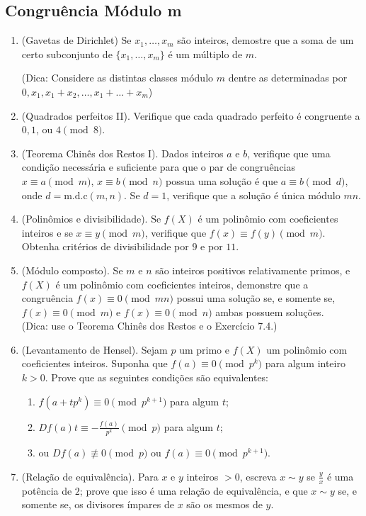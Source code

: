 \subsection{Congruência Módulo m}

\begin{enumerate}[label=7.\arabic*.]
    \item (Gavetas de Dirichlet) Se $x_1,\ldots,x_m$ são inteiros, demostre que a soma de um certo subconjunto
    de $\{x_1,\ldots,x_m\}$ é um múltiplo de $m$.

    (Dica: Considere as distintas classes módulo $m$ dentre as determinadas por $0, x_1, x_1 + x_2, \ldots , x_1 + \ldots + x_m$)

    \item (Quadrados perfeitos II). Verifique que cada quadrado perfeito é congruente a 
    $0, 1$, ou $4 \pmod{8}$.

    \item (Teorema Chinês dos Restos I). Dados inteiros $a$ e $b$, verifique que uma condição 
    necessária e suficiente para que o par de congruências $x \equiv a \pmod{m}$, 
    $x \equiv b \pmod{n}$ possua uma solução é que $a \equiv b \pmod{d}$, onde $d = \text{m.d.c}(m,n)$. Se $d = 1$, 
    verifique que a solução é única módulo $mn$.

    \item (Polinômios e divisibilidade). Se $f(X)$ é um polinômio com coeficientes inteiros 
    e se $x \equiv y \pmod{m}$, verifique que $f(x) \equiv f(y) \pmod{m}$. Obtenha critérios de 
    divisibilidade por $9$ e por $11$.

    \item (Módulo composto). Se $m$ e $n$ são inteiros positivos relativamente primos, e $f(X)$ 
    é um polinômio com coeficientes inteiros, demonstre que a congruência 
    $f(x) \equiv 0 \pmod{mn}$ possui uma solução se, e somente se, $f(x) \equiv 0 \pmod{m}$ e 
    $f(x) \equiv 0 \pmod{n}$ ambas possuem soluções. \\
    (Dica: use o Teorema Chinês dos Restos e o Exercício 7.4.)

    \item (Levantamento de Hensel). Sejam $p$ um primo e $f(X)$ um polinômio com coeficientes 
    inteiros. Suponha que $f(a) \equiv 0 \pmod{p^k}$ para algum inteiro $k>0$. Prove que as 
    seguintes condições são equivalentes:
    \begin{enumerate}
        \item[(i)] $f(a + tp^k) \equiv 0 \pmod{p^{k+1}}$ para algum $t$;
        \item[(ii)] $Df(a)t \equiv -\frac{f(a)}{p^k} \pmod{p}$ para algum $t$;
        \item[(iii)] ou $Df(a) \not\equiv 0 \pmod{p}$ ou $f(a) \equiv 0 \pmod{p^{k+1}}$.
    \end{enumerate}

    \item (Relação de equivalência). Para $x$ e $y$ inteiros $>0$, escreva $x \sim y$ se $\frac{y}{x}$ é uma potência 
    de $2$; prove que isso é uma relação de equivalência, e que $x \sim y$ se, e somente se, 
    os divisores ímpares de $x$ são os mesmos de $y$.

\end{enumerate}
